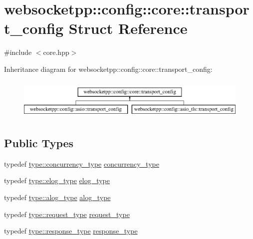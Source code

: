 \hypertarget{structwebsocketpp_1_1config_1_1core_1_1transport__config}{}\section{websocketpp\+:\+:config\+:\+:core\+:\+:transport\+\_\+config Struct Reference}
\label{structwebsocketpp_1_1config_1_1core_1_1transport__config}


{\ttfamily \#include $<$core.\+hpp$>$}

Inheritance diagram for websocketpp\+:\+:config\+:\+:core\+:\+:transport\+\_\+config\+:\begin{figure}[H]
\begin{center}
\leavevmode
\includegraphics[height=2.000000cm]{structwebsocketpp_1_1config_1_1core_1_1transport__config}
\end{center}
\end{figure}
\subsection*{Public Types}
\begin{DoxyCompactItemize}
\item 
typedef \hyperlink{structwebsocketpp_1_1config_1_1core_a894e9dea6f10e890ea21a687607c2f70}{type\+::concurrency\+\_\+type} \hyperlink{structwebsocketpp_1_1config_1_1core_1_1transport__config_a373a58261c0eaf203726b6a62436362a}{concurrency\+\_\+type}
\item 
typedef \hyperlink{structwebsocketpp_1_1config_1_1core_ac037ffb73b675a6251f3b86433b4eb17}{type\+::elog\+\_\+type} \hyperlink{structwebsocketpp_1_1config_1_1core_1_1transport__config_ae7514c1c62b41184ec7133de469ab3ae}{elog\+\_\+type}
\item 
typedef \hyperlink{structwebsocketpp_1_1config_1_1core_a3b2c116aa4077f10b085f008b48028e2}{type\+::alog\+\_\+type} \hyperlink{structwebsocketpp_1_1config_1_1core_1_1transport__config_aba152072bfdf296a067d5f860401824d}{alog\+\_\+type}
\item 
typedef \hyperlink{structwebsocketpp_1_1config_1_1core_a6b17eee7cb81f247afc8f3d7b3a3fc9e}{type\+::request\+\_\+type} \hyperlink{structwebsocketpp_1_1config_1_1core_1_1transport__config_aab3b5759b5b1f8c06da99319612c061c}{request\+\_\+type}
\item 
typedef \hyperlink{structwebsocketpp_1_1config_1_1core_a08e9a1d498f9002cbabcb1102df6005b}{type\+::response\+\_\+type} \hyperlink{structwebsocketpp_1_1config_1_1core_1_1transport__config_a93430d48551cc6d5cdee09d54840eb76}{response\+\_\+type}
\end{DoxyCompactItemize}
